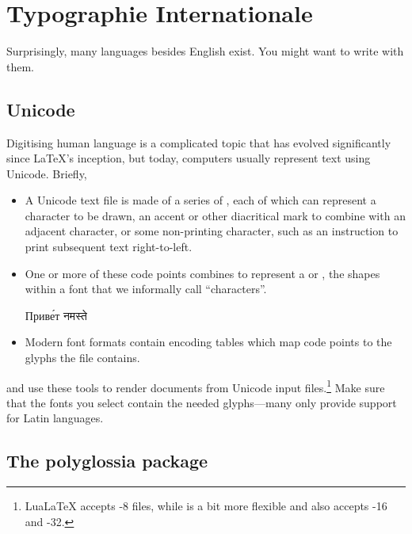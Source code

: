 \chapter{Typographie Internationale}

Surprisingly, many languages besides English exist.
You might want to write with them.

\section{Unicode}

Digitising human language is a complicated topic that has evolved significantly
since \LaTeX's inception, but today,
computers usually represent text using Unicode. Briefly,
\begin{itemize}
\item A Unicode text file is made of a series of ,
    each of which can represent a character to be drawn,
    an accent or other diacritical mark to combine with an adjacent character,
    or some non-printing character,
    such as an instruction to print subsequent text right-to-left.
\item One or more of these code points combines to represent a
     or ,
    the shapes within a font that we informally call ``characters''\quotekern.
\begin{centerfigure}
\large%
%
Приве́т
\quad{}%
नमस्ते
\end{centerfigure}
\item Modern font formats contain encoding tables
    which map code points to the glyphs the file contains.
\end{itemize}
\LuaLaTeX{} and \XeLaTeX{} use these tools to render documents
from Unicode input
files.\punckern\footnote{LuaLaTeX accepts \mbox{-8} files,
while \XeLaTeX{} is a bit more flexible and also
accepts \mbox{-16} and
\mbox{-32}.}
Make sure that the fonts you select contain the needed glyphs---many
only provide support for Latin languages.

\section{The polyglossia package}

